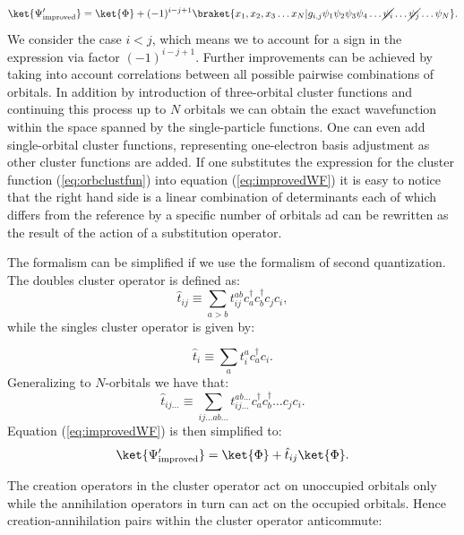 \documentclass[twoside,english]{uiofysmaster}
\begin{document}
\begin{equation}\label{eq:improvedWF}
\ket{\Psi_{\text{improved}}^\prime} = \ket{\Phi} + (-1)^{i-j+1}\braket{x_1, x_2, x_3 \dots x_N|g_{i,j}\psi_1\psi_2\psi_3\psi_4 \dots \cancel{\psi_i} \dots \cancel{\psi_j} \dots \psi_N}.
\end{equation}
We consider the case $i<j$, which means we to account for a sign in
the expression via factor $(-1)^{i-j+1}$.  Further improvements can be
achieved by taking into account correlations between all possible
pairwise combinations of orbitals. In addition by introduction of
three-orbital cluster functions and continuing this process up to $N$
orbitals we can obtain the exact wavefunction within the space spanned
by the single-particle functions. One can even add single-orbital
cluster functions, representing one-electron basis adjustment as other
cluster functions are added.  If one substitutes the expression for
the cluster function (\ref{eq:orbclustfun}) into equation
(\ref{eq:improvedWF}) it is easy to notice that the right hand side is
a linear combination of determinants each of which differs from the
reference by a specific number of orbitals ad can be rewritten as the
result of the action of a substitution operator.

The formalism can be simplified if we use the formalism of 
second quantization. The doubles
cluster operator is defined as:
\begin{equation*}
\hat{t}_{ij} \equiv \sum_{a>b}t_{ij}^{ab} c_a^\dag c_b^\dag c_j c_i,
\end{equation*}
while the singles cluster operator is given by:

\begin{equation*}
\hat{t}_{i} \equiv \sum_{a}t_{i}^{a} c_a^\dag c_i.
\end{equation*}
Generalizing to $N$-orbitals we have that:
\begin{equation*}
\hat{t}_{ij\dots} \equiv \sum_{ij\dots ab \dots}t_{ij\dots}^{ab\dots} c_a^\dag c_b^\dag \dots c_j c_i.
\end{equation*}
Equation (\ref{eq:improvedWF}) is then simplified to:
\begin{equation*}
\ket{\Psi_{\text{improved}}^\prime} =\ket{\Phi} + \hat{t}_{ij}\ket{\Phi}.
\end{equation*}

The creation operators in the cluster operator act on unoccupied
orbitals only while the annihilation operators in turn can act on the
occupied orbitals. Hence creation-annihilation pairs within the
cluster operator anticommute:
\end{document}
